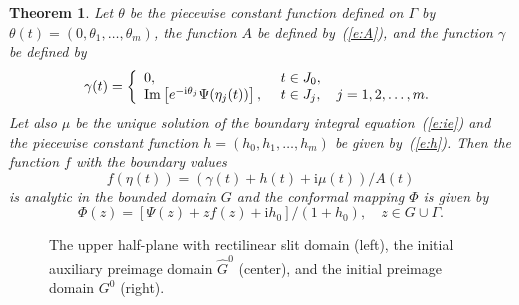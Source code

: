 \documentclass[11pt,a4paper]{article}
\newtheorem{theorem}{Theorem}
\renewcommand{\Im}{\mathop{\mathrm{Im}}}
\renewcommand{\i}{\mathrm{i}}
\renewcommand{\Im}{\mathop{\mathrm{Im}}}
\renewcommand{\i}{\mathrm{i}}
\begin{document}
\begin{theorem}\label{thm:cm-half}
Let $\theta$ be the piecewise constant function defined on $\Gamma$ by $\theta(t)=(0,\theta_1,\ldots,\theta_m)$, the function $A$ be defined by~(\ref{e:A}), and the function $\gamma$ be defined by
\begin{equation}
\gamma(t)=
 \left\{ \begin{array}{l@{\hspace{0.5cm}}l}
0,&t\in J_{0},\\
\Im\left[e^{-\i\theta_j}\Psi(\eta_j(t))\right],&t\in J_j, \quad j=1,2, \ldots,m.
\end{array}
\right.
\end{equation}
Let also $\mu$ be the unique solution of the boundary integral equation~(\ref{e:ie}) and the piecewise constant function $h=(h_0,h_1,\ldots,h_m)$ be given by~(\ref{e:h}). Then the function $f$ with the boundary values
\begin{equation}\label{eq:f-half}
f(\eta(t))=(\gamma(t)+h(t)+\i\mu(t))/A(t)
\end{equation}
is analytic in the bounded domain $G$ and the conformal mapping $\Phi$ is 
given by
\begin{equation}\label{eq:Phi-half}
\Phi(z)=\left[\Psi(z)+zf(z)+\i h_0\right]/(1+h_0), \quad z\in G\cup\Gamma. 
\end{equation}
\end{theorem}

\begin{figure}[ht] %
\centerline{
\hfill
{}
\hfill
{}
}
\caption{The upper half-plane with rectilinear slit domain (left), the initial auxiliary preimage domain $\hat G^0$ (center), and the initial preimage domain $G^0$ (right).} 
\label{f:half}
\end{figure}
\end{document}
